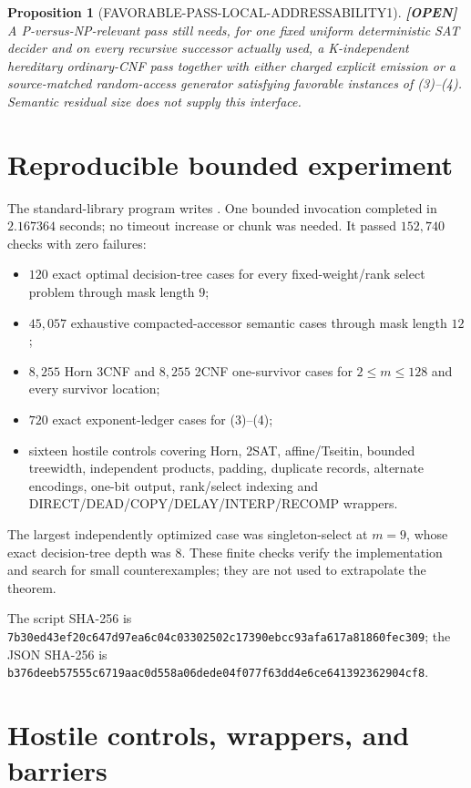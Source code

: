 \documentclass[11pt]{article}
\newtheorem{proposition}{Proposition}
\newcommand{\status}[1]{\textbf{[#1]}}
\begin{document}
\begin{proposition}[FAVORABLE-PASS-LOCAL-ADDRESSABILITY1]
\status{OPEN} A P-versus-NP-relevant pass still needs, for one fixed uniform
deterministic SAT decider and on every recursive successor actually used, a
K-independent hereditary ordinary-CNF pass together with either charged
explicit emission or a source-matched random-access generator satisfying
favorable instances of (3)--(4).  Semantic residual size does not supply
this interface.
\end{proposition}

\section{Reproducible bounded experiment}

The standard-library program
writes
.
One bounded invocation completed in $2.167364$ seconds; no timeout increase
or chunk was needed.  It passed $152{,}740$ checks with zero failures:
\begin{itemize}
\item $120$ exact optimal decision-tree cases for every fixed-weight/rank
select problem through mask length $9$;
\item $45{,}057$ exhaustive compacted-accessor semantic cases through mask
length $12$;
\item $8{,}255$ Horn 3CNF and $8{,}255$ 2CNF one-survivor cases for
$2\le m\le128$ and every survivor location;
\item $720$ exact exponent-ledger cases for (3)--(4);
\item sixteen hostile controls covering Horn, 2SAT, affine/Tseitin,
bounded treewidth, independent products, padding, duplicate records,
alternate encodings, one-bit output, rank/select indexing and
DIRECT/DEAD/COPY/DELAY/INTERP/RECOMP wrappers.
\end{itemize}
The largest independently optimized case was singleton-select at $m=9$,
whose exact decision-tree depth was $8$.  These finite checks verify the
implementation and search for small counterexamples; they are not used to
extrapolate the theorem.

The script SHA-256 is
\texttt{7b30ed43ef20c647d97ea6c04c03302502c17390ebcc93afa617a81860fec309};
the JSON SHA-256 is
\texttt{b376deeb57555c6719aac0d558a06dede04f077f63dd4e6ce641392362904cf8}.

\section{Hostile controls, wrappers, and barriers}
\end{document}
